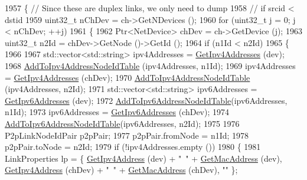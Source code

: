 \begin{DoxyCode}
1957             \{ \textcolor{comment}{// Since these are duplex links, we only need to dump}
1958               \textcolor{comment}{// if srcid < dstid}
1959               uint32\_t nChDev = ch->GetNDevices ();
1960               \textcolor{keywordflow}{for} (uint32\_t j = 0; j < nChDev; ++j)
1961                 \{
1962                   Ptr<NetDevice> chDev = ch->GetDevice (j);
1963                   uint32\_t n2Id = chDev->GetNode ()->GetId ();
1964                   \textcolor{keywordflow}{if} (n1Id < n2Id)
1965                     \{ 
1966 
1967                       std::vector<std::string> ipv4Addresses = \hyperlink{classns3_1_1AnimationInterface_a73dca227bb2e3986b1ccfd83cdea2a4c}{GetIpv4Addresses} (dev);
1968                       \hyperlink{classns3_1_1AnimationInterface_a6393d37e753d3445d8915a4f3bc748c7}{AddToIpv4AddressNodeIdTable} (ipv4Addresses, n1Id);
1969                       ipv4Addresses = \hyperlink{classns3_1_1AnimationInterface_a73dca227bb2e3986b1ccfd83cdea2a4c}{GetIpv4Addresses} (chDev);
1970                       \hyperlink{classns3_1_1AnimationInterface_a6393d37e753d3445d8915a4f3bc748c7}{AddToIpv4AddressNodeIdTable} (ipv4Addresses, n2Id);
1971                       std::vector<std::string> ipv6Addresses = \hyperlink{classns3_1_1AnimationInterface_a6cb3ba286e8b93b93b1ef1e79ce4ee0e}{GetIpv6Addresses} (dev);
1972                       \hyperlink{classns3_1_1AnimationInterface_a77ab25cf252dc135989298d9c96d452b}{AddToIpv6AddressNodeIdTable}(ipv6Addresses, n1Id);
1973                       ipv6Addresses = \hyperlink{classns3_1_1AnimationInterface_a6cb3ba286e8b93b93b1ef1e79ce4ee0e}{GetIpv6Addresses} (chDev);
1974                       \hyperlink{classns3_1_1AnimationInterface_a77ab25cf252dc135989298d9c96d452b}{AddToIpv6AddressNodeIdTable}(ipv6Addresses, n2Id);
1975 
1976                       P2pLinkNodeIdPair p2pPair;
1977                       p2pPair.fromNode = n1Id;
1978                       p2pPair.toNode = n2Id;
1979                       \textcolor{keywordflow}{if} (!ipv4Addresses.empty ())
1980                         \{
1981                           LinkProperties lp = \{ \hyperlink{classns3_1_1AnimationInterface_af000d578afa61b609866889aa38c4663}{GetIpv4Address} (dev) + \textcolor{stringliteral}{"~"} + 
      \hyperlink{classns3_1_1AnimationInterface_a82c8e06d9c44523db90adb5424c08806}{GetMacAddress} (dev), \hyperlink{classns3_1_1AnimationInterface_af000d578afa61b609866889aa38c4663}{GetIpv4Address} (chDev) + \textcolor{stringliteral}{"~"} + 
      \hyperlink{classns3_1_1AnimationInterface_a82c8e06d9c44523db90adb5424c08806}{GetMacAddress} (chDev), \textcolor{stringliteral}{""} \};

\end{DoxyCode}
